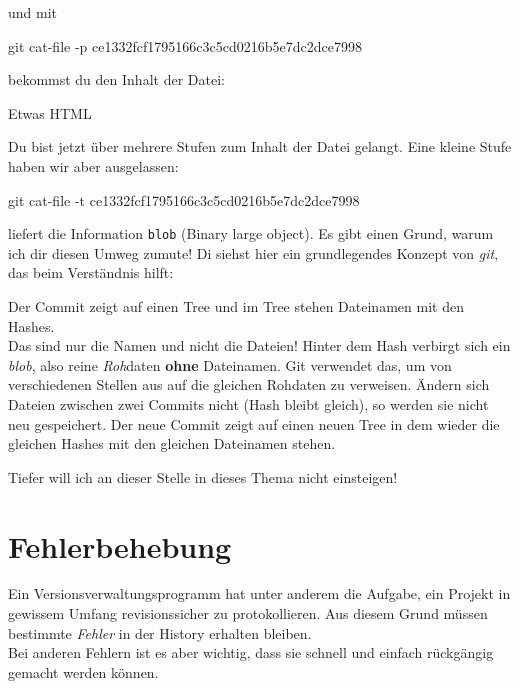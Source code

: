 \documentclass[
  letterpaper,
  DIV=11]{scrreprt}
\newenvironment{Shaded}{\begin{snugshade}}{\end{snugshade}}
\newcommand{\AttributeTok}[1]{\textcolor[rgb]{0.40,0.45,0.13}{#1}}
\newcommand{\ExtensionTok}[1]{\textcolor[rgb]{0.00,0.23,0.31}{#1}}
\newcommand{\FunctionTok}[1]{\textcolor[rgb]{0.28,0.35,0.67}{#1}}
\newcommand{\NormalTok}[1]{\textcolor[rgb]{0.00,0.23,0.31}{#1}}
\newcommand{\git}{\textit{git}\xspace}
\begin{document}
und mit

\begin{Shaded}
\begin{Highlighting}[]
\FunctionTok{git}\NormalTok{ cat{-}file }\AttributeTok{{-}p}\NormalTok{ ce1332fcf1795166c3c5cd0216b5e7dc2dce7998}
\end{Highlighting}
\end{Shaded}

bekommst du den Inhalt der Datei:

\begin{Shaded}
\begin{Highlighting}[]
\ExtensionTok{Etwas}\NormalTok{ HTML}
\end{Highlighting}
\end{Shaded}

Du bist jetzt über mehrere Stufen zum Inhalt der Datei gelangt. Eine
kleine Stufe haben wir aber ausgelassen:

\begin{Shaded}
\begin{Highlighting}[]
\FunctionTok{git}\NormalTok{ cat{-}file }\AttributeTok{{-}t}\NormalTok{ ce1332fcf1795166c3c5cd0216b5e7dc2dce7998}
\end{Highlighting}
\end{Shaded}

liefert die Information \texttt{blob} (Binary large object). Es gibt
einen Grund, warum ich dir diesen Umweg zumute! Di siehst hier ein
grundlegendes Konzept von \git, das beim Verständnis hilft:

Der Commit zeigt auf einen Tree und im Tree stehen Dateinamen mit den
Hashes.\\
Das sind nur die Namen und nicht die Dateien! Hinter dem Hash verbirgt
sich ein \emph{blob}, also reine \emph{Roh}daten \textbf{ohne}
Dateinamen. Git verwendet das, um von verschiedenen Stellen aus auf die
gleichen Rohdaten zu verweisen. Ändern sich Dateien zwischen zwei
Commits nicht (Hash bleibt gleich), so werden sie nicht neu gespeichert.
Der neue Commit zeigt auf einen neuen Tree in dem wieder die gleichen
Hashes mit den gleichen Dateinamen stehen.

Tiefer will ich an dieser Stelle in dieses Thema nicht einsteigen!

\section{Fehlerbehebung}\label{fehlerbehebung}

Ein Versionsverwaltungsprogramm hat unter anderem die Aufgabe, ein
Projekt in gewissem Umfang revisionssicher zu protokollieren. Aus diesem
Grund müssen bestimmte \emph{Fehler} in der History erhalten bleiben.\\
Bei anderen Fehlern ist es aber wichtig, dass sie schnell und einfach
rückgängig gemacht werden können.
\end{document}
